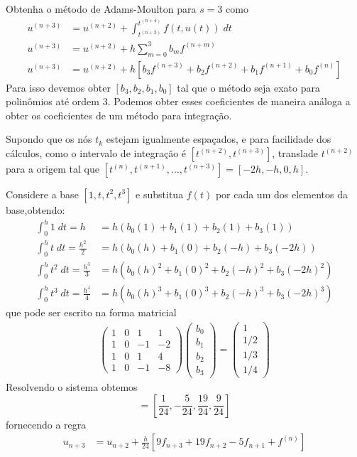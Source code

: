 \begin{ex} Obtenha o método de Adams-Moulton para $s=3$ como
\begin{eqnarray}\label{AM4}
  u^{(n+3)}  &= u^{(n+2)}  + \int _{t^{(n+3)}}^{t^{(n+4)}} f(t,u(t)) \; dt \\
  u^{(n+3)}  &= u^{(n+2)}  + h \sum_{m=0}^{3} b_m f^{(n+m)} \\
  u^{(n+3)}  &= u^{(n+2)}  + h \left[b_3f^{(n+3)} +b_2f^{(n+2)} +b_1f^{(n+1)} +b_0f^{(n)}\right]
\end{eqnarray}
Para isso devemos obter $[b_3,b_2,b_1,b_0]$ tal que o método seja exato para polinômios até ordem $3$. Podemos obter esses coeficientes de maneira análoga a obter os coeficientes de um método para integração.

Supondo que os nós $t_k$ estejam igualmente espaçados, e para facilidade dos cálculos, como o intervalo de integração é $[t^{(n+2)},t^{(n+3)}]$, translade $t^{(n+2)}$ para a origem tal que $[t^{(n)},t^{(n+1)},\ldots ,t^{(n+3)}]=[-2h,-h,0,h]$.

Considere a base $[1, t, t^2, t^3]$ e substitua $f(t)$ por cada um dos elementos da base,obtendo:
\begin{eqnarray}
      \int _0^{h} 1  \;dt = h             &= h( b_0(1)  +b_1(1)   + b_2(1)   + b_3(1)    )\\
      \int _0^{h} t  \;dt = \frac{h^2}{2}  &= h( b_0(h)  +b_1(0)   + b_2(-h) + b_3(-2h)  )\\
      \int _0^{h} t^2 \;dt = \frac{h^3}{3}  &= h( b_0(h)^2 +b_1(0)^2  + b_2(-h)^2+ b_3(-2h)^2 )\\
      \int _0^{h} t^3 \;dt = \frac{h^4}{4} &= h( b_0(h)^3 +b_1(0)^3  + b_2(-h)^3+ b_3(-2h)^3 )
\end{eqnarray}
que pode ser escrito na forma matricial
\begin{eqnarray}
\left(
  \begin{array}{cccc}
    1  & 0 & 1    & 1   \\
    1  & 0 & -1   & -2  \\
    1  & 0 & 1    & 4   \\
    1  & 0 & -1   & -8
  \end{array}
\right)
\left(\begin{array}{c}  b_0 \\ b_1\\ b_2\\b_3   \end{array}\right)
=
\left(\begin{array}{c}  1  \\ 1/2 \\ 1/3 \\ 1/4  \end{array}\right)
\end{eqnarray}
Resolvendo o sistema obtemos
\begin{equation} [b_0,b_1,b_2,b_3]=\left[\frac{1}{24},-\frac{5}{24},\frac{19}{24},\frac{9}{24}\right] \end{equation}
fornecendo a regra
\begin{eqnarray}
  u_{n+3}  &= u_{n+2}  + \frac{h}{24} [9 f_{n+3} +19f_{n+2} -5f_{n+1} +f^{(n)}]
\end{eqnarray}
\end{ex}




